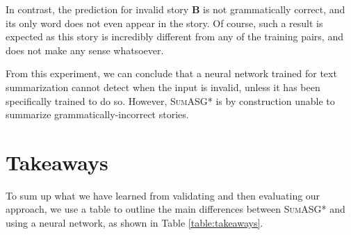 In contrast, the prediction for invalid story \textbf{B} is not grammatically correct, and its only word does not even appear in the story. Of course, such a result is expected as this story is incredibly different from any of the training pairs, and does not make any sense whatsoever.

From this experiment, we can conclude that a neural network trained for text summarization cannot detect when the input is invalid, unless it has been specifically trained to do so. However, \textsc{SumASG*} is by construction unable to summarize grammatically-incorrect stories.

\section{Takeaways}
\label{sec:evaluation_takeaways}

To sum up what we have learned from validating and then evaluating our approach, we use a table to outline the main differences between \textsc{SumASG*} and using a neural network, as shown in Table \ref{table:takeaways}.

